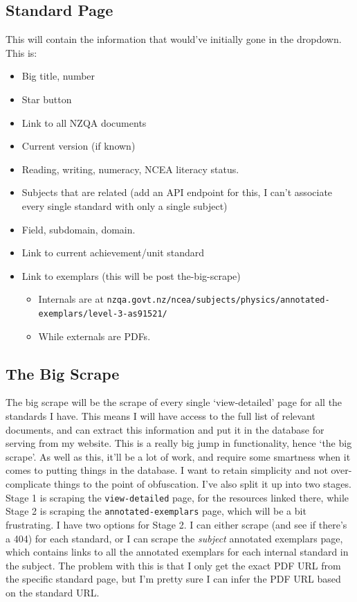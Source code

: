 \documentclass{article}
\begin{document}
\subsection*{Standard Page}
This will contain the information that would've initially gone in the dropdown. This is:
\begin{itemize}
    \item Big title, number
    \item Star button
    \item Link to all NZQA documents
    \item Current version (if known)
    \item Reading, writing, numeracy, NCEA literacy status.
    \item Subjects that are related (add an API endpoint for this, I can't associate every single standard with only a single subject)
    \item Field, subdomain, domain.
    \item Link to current achievement/unit standard
    \item Link to exemplars (this will be post the-big-scrape)
    \begin{itemize}
        \item Internals are at \texttt{nzqa.govt.nz/ncea/subjects/physics/annotated-exemplars/level-3-as91521/}
        \item While externals are PDFs.
    \end{itemize}
\end{itemize}

\subsection*{The Big Scrape}
The big scrape will be the scrape of every single `view-detailed' page for all the standards I have. This means I will have access to the full list of relevant documents, and can extract this information and put it in the database for serving from my website. This is a really big jump in functionality, hence `the big scrape'. As well as this, it'll be a lot of work, and require some smartness when it comes to putting things in the database. I want to retain simplicity and not over-complicate things to the point of obfuscation. I've also split it up into two stages. Stage 1 is scraping the \texttt{view-detailed} page, for the resources linked there, while Stage 2 is scraping the \texttt{annotated-exemplars} page, which will be a bit frustrating. I have two options for Stage 2. I can either scrape (and see if there's a 404) for each standard, or I can scrape the \textit{subject} annotated exemplars page, which contains links to all the annotated exemplars for each internal standard in the subject. The problem with this is that I only get the exact PDF URL from the specific standard page, but I'm pretty sure I can infer the PDF URL based on the standard URL.
\end{document}
